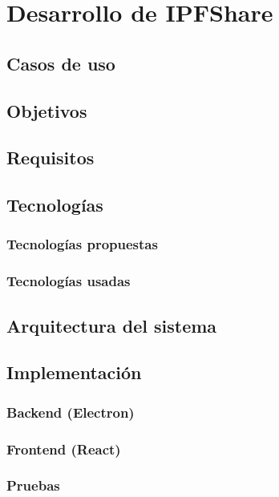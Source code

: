 \chapter{Desarrollo de IPFShare}

\section{Casos de uso}

\section{Objetivos}

\section{Requisitos}

\section{Tecnologías}
\subsection{Tecnologías propuestas}
\subsection{Tecnologías usadas}

\section{Arquitectura del sistema}

\section{Implementación}
\subsection{Backend (Electron)}
\subsection{Frontend (React)}

\subsection{Pruebas}